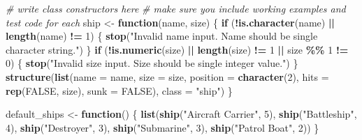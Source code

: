\documentclass[
]{article}
\newenvironment{Shaded}{\begin{snugshade}}{\end{snugshade}}
\newcommand{\AttributeTok}[1]{\textcolor[rgb]{0.13,0.29,0.53}{#1}}
\newcommand{\CommentTok}[1]{\textcolor[rgb]{0.56,0.35,0.01}{\textit{#1}}}
\newcommand{\ConstantTok}[1]{\textcolor[rgb]{0.56,0.35,0.01}{#1}}
\newcommand{\ControlFlowTok}[1]{\textcolor[rgb]{0.13,0.29,0.53}{\textbf{#1}}}
\newcommand{\DecValTok}[1]{\textcolor[rgb]{0.00,0.00,0.81}{#1}}
\newcommand{\FunctionTok}[1]{\textcolor[rgb]{0.13,0.29,0.53}{\textbf{#1}}}
\newcommand{\NormalTok}[1]{#1}
\newcommand{\OtherTok}[1]{\textcolor[rgb]{0.56,0.35,0.01}{#1}}
\newcommand{\SpecialCharTok}[1]{\textcolor[rgb]{0.81,0.36,0.00}{\textbf{#1}}}
\newcommand{\StringTok}[1]{\textcolor[rgb]{0.31,0.60,0.02}{#1}}
\begin{document}
\begin{Shaded}
\begin{Highlighting}[]
\CommentTok{\# write class constructors here}
\CommentTok{\# make sure you include working examples and test code for each}
\NormalTok{ship }\OtherTok{\textless{}{-}} \ControlFlowTok{function}\NormalTok{(name, size) \{}
  \ControlFlowTok{if}\NormalTok{ (}\SpecialCharTok{!}\FunctionTok{is.character}\NormalTok{(name) }\SpecialCharTok{||} \FunctionTok{length}\NormalTok{(name) }\SpecialCharTok{!=} \DecValTok{1}\NormalTok{) \{}
    \FunctionTok{stop}\NormalTok{(}\StringTok{"Invalid name input. Name should be single character string."}\NormalTok{)}
\NormalTok{  \}}
  \ControlFlowTok{if}\NormalTok{ (}\SpecialCharTok{!}\FunctionTok{is.numeric}\NormalTok{(size) }\SpecialCharTok{||} \FunctionTok{length}\NormalTok{(size) }\SpecialCharTok{!=} \DecValTok{1} \SpecialCharTok{||}\NormalTok{ size }\SpecialCharTok{\%\%} \DecValTok{1} \SpecialCharTok{!=} \DecValTok{0}\NormalTok{) \{}
    \FunctionTok{stop}\NormalTok{(}\StringTok{"Invalid size input. Size should be single integer value."}\NormalTok{)}
\NormalTok{  \}}
  \FunctionTok{structure}\NormalTok{(}\FunctionTok{list}\NormalTok{(}\AttributeTok{name =}\NormalTok{ name, }
                 \AttributeTok{size =}\NormalTok{ size,}
                 \AttributeTok{position =} \FunctionTok{character}\NormalTok{(}\DecValTok{2}\NormalTok{),}
                 \AttributeTok{hits =} \FunctionTok{rep}\NormalTok{(}\ConstantTok{FALSE}\NormalTok{, size),}
                 \AttributeTok{sunk =} \ConstantTok{FALSE}\NormalTok{), }
            \AttributeTok{class =} \StringTok{"ship"}\NormalTok{)}
\NormalTok{\}}

\NormalTok{default\_ships }\OtherTok{\textless{}{-}} \ControlFlowTok{function}\NormalTok{() \{}
  \FunctionTok{list}\NormalTok{(}\FunctionTok{ship}\NormalTok{(}\StringTok{"Aircraft Carrier"}\NormalTok{, }\DecValTok{5}\NormalTok{), }
       \FunctionTok{ship}\NormalTok{(}\StringTok{"Battleship"}\NormalTok{, }\DecValTok{4}\NormalTok{), }
       \FunctionTok{ship}\NormalTok{(}\StringTok{"Destroyer"}\NormalTok{, }\DecValTok{3}\NormalTok{), }
       \FunctionTok{ship}\NormalTok{(}\StringTok{"Submarine"}\NormalTok{, }\DecValTok{3}\NormalTok{), }
       \FunctionTok{ship}\NormalTok{(}\StringTok{"Patrol Boat"}\NormalTok{, }\DecValTok{2}\NormalTok{))}
\NormalTok{\}}


\end{Highlighting}
\end{Shaded}
\end{document}
